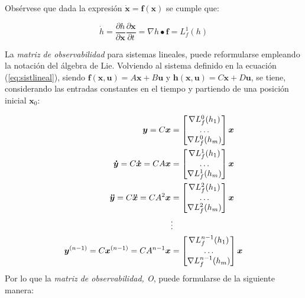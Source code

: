\noindent
Obsérvese que dada la expresión $\boldsymbol{\dot{x}} = \boldsymbol{f}(\boldsymbol{x})$ se cumple que:

\[
\dot{h} = \frac{\partial h}{\partial \boldsymbol{x}} \frac{\partial \boldsymbol{x}}{\partial t} = 
	\nabla h \bullet \boldsymbol{f} = L_f^{1}(h)
\]

La \emph{matriz de observabilidad} para sistemas lineales, puede reformularse empleando la notación del álgebra de Lie. Volviendo al sistema definido en la ecuación (\ref{eq:sistlineal}), siendo $\boldsymbol{f}(\boldsymbol{x},\boldsymbol{u}) = A\boldsymbol{x} + B\boldsymbol{u}$ y $\boldsymbol{h}(\boldsymbol{x},\boldsymbol{u}) = C\boldsymbol{x} + D\boldsymbol{u}$, se tiene, considerando las entradas constantes en el tiempo y partiendo de una posición inicial $\boldsymbol{x}_0$:

\begin{align*}
	\boldsymbol{y} = C\boldsymbol{x} &= \begin{bmatrix} \nabla L_f^{0}(h_1) \\ \dots \\ \nabla L_f^{0}(h_m) \end{bmatrix}  \boldsymbol{x} \notag \\
	\boldsymbol{\dot{y}} = C\boldsymbol{\dot{x}} = CA\boldsymbol{x} &= \begin{bmatrix} \nabla L_f^{1}(h_1) \\ \dots \\ \nabla L_f^{1}(h_m) \end{bmatrix} \boldsymbol{x} \\
	\boldsymbol{\ddot{y}} = C\boldsymbol{\ddot{x}} = CA^{2}\boldsymbol{x} &= \begin{bmatrix} \nabla L_f^{2}(h_1) \\ \dots \\ \nabla L_f^{2}(h_m) \end{bmatrix} \boldsymbol{x}
	\\ &\vdots \\
	\boldsymbol{y}^{(n-1)} = C\boldsymbol{x}^{(n-1)} = CA^{n-1}\boldsymbol{x} &= \begin{bmatrix} \nabla L_f^{n-1}(h_1) \\ \dots \\ \nabla L_f^{n-1}(h_m) \end{bmatrix} \boldsymbol{x} 
\end{align*}
\noindent
Por lo que la \emph{matriz de observabilidad, O}, puede formularse de la siguiente manera:

